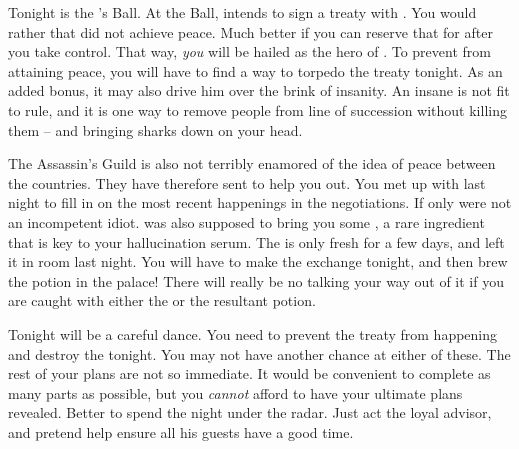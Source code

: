 \documentclass[char]{NeptuneBall}
\begin{document}
Tonight is the \cExExKing{}'s Ball. At the Ball, \cKing{\King} \cKing{} intends to sign a treaty with \pPacifica{}. You would rather that \cKing{} did not achieve peace. Much better if you can reserve that for after you take control. That way, \emph{you} will be hailed as the hero of \pAtlantis{}. To prevent \cKing{} from attaining peace, you will have to find a way to torpedo the treaty tonight. As an added bonus, it may also drive him over the brink of insanity. An insane \cKing{\King} is not fit to rule, and it is one way to remove people from line of succession without killing them -- and bringing sharks down on your head.

The Assassin's Guild is also not terribly enamored of the idea of peace between the countries. They have therefore sent \cSpy{} to help you out. You met up with \cSpy{\them} last night to fill \cSpy{\them} in on the most recent happenings in the negotiations. If only \cSpy{} were not an incompetent idiot.  \cSpy{\They} was also supposed to bring you some \iHemlock{\MYname}, a rare ingredient that is key to your hallucination serum. The \iHemlock{\MYname} is only fresh for a few days, and \cSpy{} left it in \cSpy{\them} room last night. You will have to make the exchange tonight, and then brew the potion in the palace! There will really be no talking your way out of it if you are caught with either the \iHemlock{\MYname} or the resultant potion.

Tonight will be a careful dance. You need to prevent the treaty from happening and destroy the \iMusicBox{} tonight. You may not have another chance at either of these. The rest of your plans are not so immediate. It would be convenient to complete as many parts as possible, but you \emph{cannot} afford to have your ultimate plans revealed. Better to spend the night under the radar. Just act the loyal advisor, and pretend help \cKing{} ensure all his guests have a good time.
\end{document}
